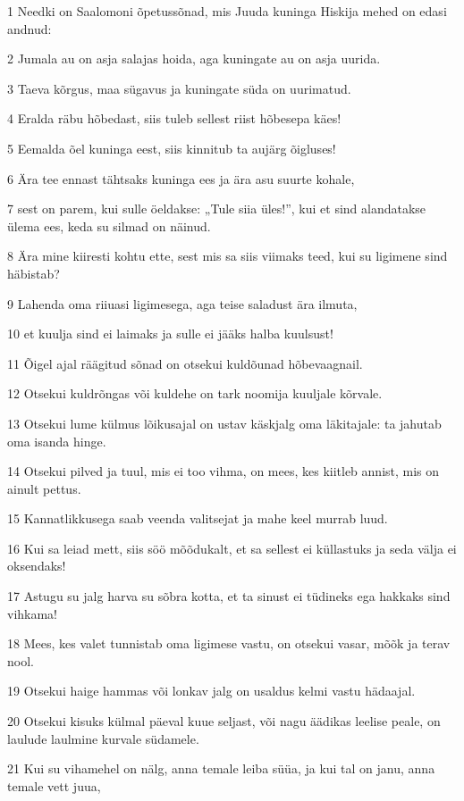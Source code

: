 \par 1 Needki on Saalomoni õpetussõnad, mis Juuda kuninga Hiskija mehed on edasi andnud:
\par 2 Jumala au on asja salajas hoida, aga kuningate au on asja uurida.
\par 3 Taeva kõrgus, maa sügavus ja kuningate süda on uurimatud.
\par 4 Eralda räbu hõbedast, siis tuleb sellest riist hõbesepa käes!
\par 5 Eemalda õel kuninga eest, siis kinnitub ta aujärg õigluses!
\par 6 Ära tee ennast tähtsaks kuninga ees ja ära asu suurte kohale,
\par 7 sest on parem, kui sulle öeldakse: „Tule siia üles!”, kui et sind alandatakse ülema ees, keda su silmad on näinud.
\par 8 Ära mine kiiresti kohtu ette, sest mis sa siis viimaks teed, kui su ligimene sind häbistab?
\par 9 Lahenda oma riiuasi ligimesega, aga teise saladust ära ilmuta,
\par 10 et kuulja sind ei laimaks ja sulle ei jääks halba kuulsust!
\par 11 Õigel ajal räägitud sõnad on otsekui kuldõunad hõbevaagnail.
\par 12 Otsekui kuldrõngas või kuldehe on tark noomija kuuljale kõrvale.
\par 13 Otsekui lume külmus lõikusajal on ustav käskjalg oma läkitajale: ta jahutab oma isanda hinge.
\par 14 Otsekui pilved ja tuul, mis ei too vihma, on mees, kes kiitleb annist, mis on ainult pettus.
\par 15 Kannatlikkusega saab veenda valitsejat ja mahe keel murrab luud.
\par 16 Kui sa leiad mett, siis söö mõõdukalt, et sa sellest ei küllastuks ja seda välja ei oksendaks!
\par 17 Astugu su jalg harva su sõbra kotta, et ta sinust ei tüdineks ega hakkaks sind vihkama!
\par 18 Mees, kes valet tunnistab oma ligimese vastu, on otsekui vasar, mõõk ja terav nool.
\par 19 Otsekui haige hammas või lonkav jalg on usaldus kelmi vastu hädaajal.
\par 20 Otsekui kisuks külmal päeval kuue seljast, või nagu äädikas leelise peale, on laulude laulmine kurvale südamele.
\par 21 Kui su vihamehel on nälg, anna temale leiba süüa, ja kui tal on janu, anna temale vett juua,
